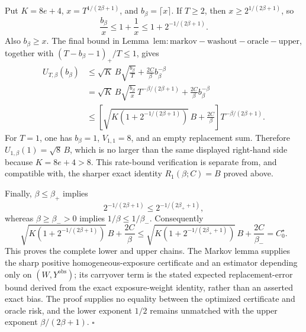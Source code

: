 Put \(K=8e+4\), \(x=T^{1/(2\beta+1)}\), and \(b_\beta=\lceil x\rceil\). If \(T\ge2\), then \(x\ge2^{1/(2\beta+1)}\), so
\[
\frac{b_\beta}{x}\le1+\frac1x\le1+2^{-1/(2\beta+1)}.
\]
Also \(b_\beta\ge x\). The final bound in Lemma~\(\mathrm{lem:markov-washout-oracle-upper}\), together with \((T-b_\beta-1)_+/T\le1\), gives
\[
\begin{aligned}
U_{T,\beta}(b_\beta)
&\le \sqrt K\,B\sqrt{\frac{b_\beta}{T}}+\frac{2C}{\beta}b_\beta^{-\beta}\\
&=\sqrt K\,B\sqrt{\frac{b_\beta}{x}}\,T^{-\beta/(2\beta+1)}
 +\frac{2C}{\beta}b_\beta^{-\beta}\\
&\le\left[\sqrt{K\left(1+2^{-1/(2\beta+1)}\right)}\,B+\frac{2C}{\beta}\right]T^{-\beta/(2\beta+1)}.
\end{aligned}
\]
For \(T=1\), one has \(b_\beta=1\), \(V_{1,1}=8\), and an empty replacement sum. Therefore \(U_{1,\beta}(1)=\sqrt8\,B\), which is no larger than the same displayed right-hand side because \(K=8e+4>8\). This rate-bound verification is separate from, and compatible with, the sharper exact identity \(R_1(\beta;C)=B\) proved above.

Finally, \(\beta\le\beta_+\) implies
\[
2^{-1/(2\beta+1)}\le2^{-1/(2\beta_++1)},
\]
whereas \(\beta\ge\beta_->0\) implies \(1/\beta\le1/\beta_-\). Consequently
\[
\sqrt{K\left(1+2^{-1/(2\beta+1)}\right)}\,B+\frac{2C}{\beta}
\le
\sqrt{K\left(1+2^{-1/(2\beta_++1)}\right)}\,B+\frac{2C}{\beta_-}
=C_0^\star.
\]
This proves the complete lower and upper chains. The Markov lemma supplies the sharp positive homogeneous-exposure certificate and an estimator depending only on \((W,Y^{\mathrm{obs}})\); its carryover term is the stated expected replacement-error bound derived from the exact exposure-weight identity, rather than an asserted exact bias. The proof supplies no equality between the optimized certificate and oracle risk, and the lower exponent \(1/2\) remains unmatched with the upper exponent \(\beta/(2\beta+1)\). \(\square\)